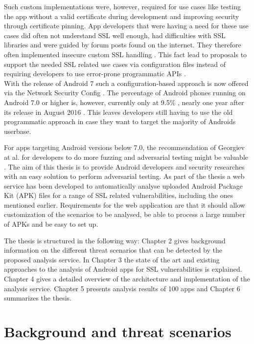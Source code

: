 \documentclass[draft,final]{vutinfth} %
\begin{document}
Such custom implementations were, however, required for use cases like testing the app without a valid certificate during development and improving security through certificate pinning. App developers that were having a need for these use cases did often not understand SSL well enough, had difficulties with SSL libraries and were guided by forum posts found on the internet. They therefore often implemented insecure custom SSL handling \cite{Fahl2013}. This fact lead to proposals to support the needed SSL related use cases via configuration files instead of requiring developers to use error-prone programmatic APIs \cite{Fahl2013,Tendulkar}. \\
With the release of Android 7 such a configuration-based approach is now offered via the Network Security Config \cite{NetworkSecurityConfig, Android7NetworkSecurityConfig}. The percentage of Android phones running on Android 7.0 or higher is, however, currently only at 9.5\% \cite{AndroidPlatformVersions}, nearly one year after its release in August 2016 \cite{Android7Release}. This leaves developers still having to use the old programmatic approach in case they want to target the majority of Androids userbase.

For apps targeting Android versions below 7.0, the recommendation of Georgiev at al. for developers to do more fuzzing and adversarial testing might be valuable \cite{Georgiev}. The aim of this thesis is to provide Android developers and security researches with an easy solution to perform adversarial testing. As part of the thesis a web service has been developed to automatically analyse uploaded Android Package Kit (APK) files for a range of SSL related vulnerabilities, including the ones mentioned earlier. Requirements for the web application are that it should allow customization of the scenarios to be analysed, be able to process a large number of APKs and be easy to set up.

The thesis is structured in the following way: Chapter 2 gives background information on the different threat scenarios that can be detected by the proposed analysis service. In Chapter 3  the state of the art and existing approaches to the analysis of Android apps for SSL vulnerabilities is explained. Chapter 4 gives a detailed overview of the architecture and implementation of the analysis service. Chapter 5 presents analysis results of 100 apps and Chapter 6 summarizes the thesis.


\chapter{Background and threat scenarios}
\end{document}
